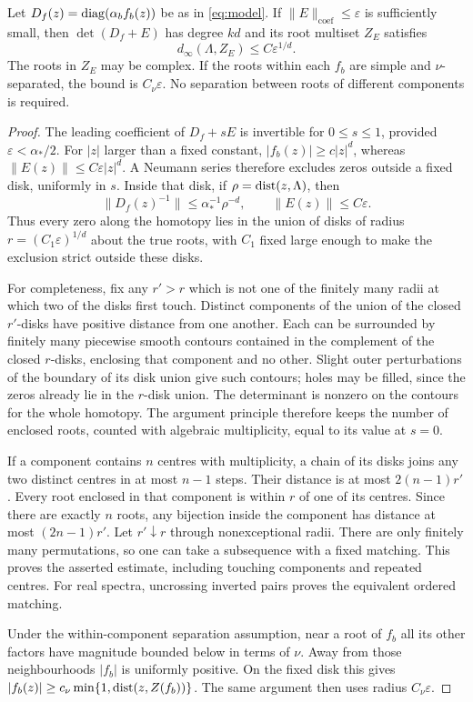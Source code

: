 \begin{lemma}\label{lem:roots}
Let $D_f(z)=\operatorname{diag}(\alpha_b f_b(z))$ be as in \eqref{eq:model}.
If $\|E\|_{\mathrm{coef}}\le\varepsilon$ is sufficiently small,
then $\det(D_f+E)$ has degree $kd$ and its root multiset $Z_E$
satisfies
\[
 d_\infty(\Lambda,Z_E)\le C\varepsilon^{1/d}.
\]
The roots in $Z_E$ may be complex. If the roots within each $f_b$
are simple and $\nu$-separated, the bound is $C_\nu\varepsilon$.
No separation between roots of different components is required.
\end{lemma}
\begin{proof}
The leading coefficient of $D_f+sE$ is invertible for $0\le s\le1$,
provided $\varepsilon<\alpha_*/2$. For $|z|$ larger than a fixed
constant, $|f_b(z)|\ge c|z|^d$, whereas
$\|E(z)\|\le C\varepsilon|z|^d$. A Neumann series therefore excludes
zeros outside a fixed disk, uniformly in $s$.
Inside that disk, if $\rho=\operatorname{dist}(z,\Lambda)$, then
\[
 \|D_f(z)^{-1}\|\le\alpha_*^{-1}\rho^{-d},
 \qquad \|E(z)\|\le C\varepsilon.
\]
Thus every zero along the homotopy lies in the union of disks of radius
$r=(C_1\varepsilon)^{1/d}$ about the true roots, with $C_1$ fixed
large enough to make the exclusion strict outside these disks.

For completeness, fix any $r'>r$ which is not one of the finitely many
radii at which two of the disks first touch. Distinct components of
the union of the closed $r'$-disks have positive distance from one
another. Each can be surrounded by finitely many piecewise smooth
contours contained in the complement of the closed $r$-disks, enclosing
that component and no other. Slight outer perturbations of the
boundary of its disk union give such contours; holes may be filled,
since the zeros already lie in the $r$-disk union. The determinant is
nonzero on the contours for the whole homotopy. The argument principle
therefore keeps the number of enclosed roots, counted with algebraic
multiplicity, equal to its value at $s=0$.

If a component contains $n$ centres with multiplicity, a chain of its
disks joins any two distinct centres in at most $n-1$ steps. Their
distance is at most $2(n-1)r'$. Every root enclosed in that component
is within $r$ of one of its centres. Since there are exactly $n$
roots, any bijection inside the component has distance at most
$(2n-1)r'$. Let $r'\downarrow r$ through nonexceptional radii.
There are only finitely many permutations, so one can take a
subsequence with a fixed matching. This proves the asserted estimate,
including touching components and repeated centres. For real spectra,
uncrossing inverted pairs proves the equivalent ordered matching.

Under the within-component separation assumption, near a root of
$f_b$ all its other factors have magnitude bounded below in terms of
$\nu$. Away from those neighbourhoods $|f_b|$ is uniformly positive.
On the fixed disk this gives
$|f_b(z)|\ge c_\nu\min\{1,\operatorname{dist}(z,Z(f_b))\}$.
The same argument then uses radius $C_\nu\varepsilon$.
\end{proof}

